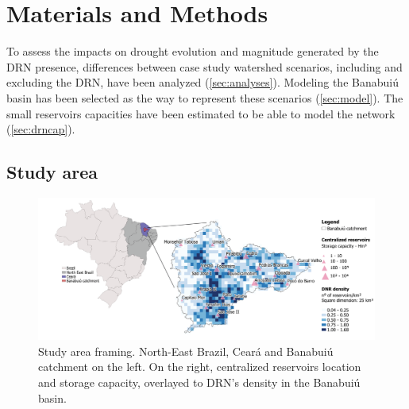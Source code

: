 \documentclass[draft]{agujournal2019}
\begin{document}
\section{Materials and Methods}
To assess the impacts on drought evolution and magnitude generated by the DRN presence, differences between case study watershed scenarios, including and excluding the DRN, have been analyzed (\ref{sec:analyses}). Modeling the Banabuiú basin has been selected as the way to represent these scenarios (\ref{sec:model}). The small reservoirs capacities have been estimated to be able to model the network (\ref{sec:drncap}).

\subsection{Study area}
\begin{figure}
 \noindent\includegraphics[width=\textwidth]{images/Figure_1.png}
 \caption{Study area framing. North-East Brazil, Ceará and Banabuiú catchment on the left. On the right, centralized reservoirs location and storage capacity, overlayed to DRN’s density in the Banabuiú basin.}
 \label{fig1}
\end{figure}
\end{document}
